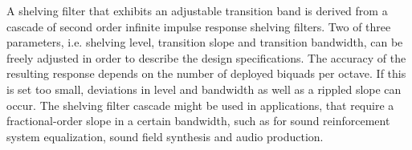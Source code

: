 A shelving filter that exhibits an adjustable transition band is derived from a
cascade of second order infinite impulse response shelving filters.
%
Two of three parameters, i.e. shelving level, transition slope and
transition bandwidth, can be freely adjusted in order to describe the design
specifications.
%
The accuracy of the resulting response depends on the number of
deployed biquads per octave.
%
If this is set too small, deviations in level and bandwidth as well as a rippled
slope can occur.
%
The shelving filter cascade might be used in applications,
that require a fractional-order slope in a certain bandwidth,
such as for sound reinforcement system equalization, sound field synthesis
and audio production.

